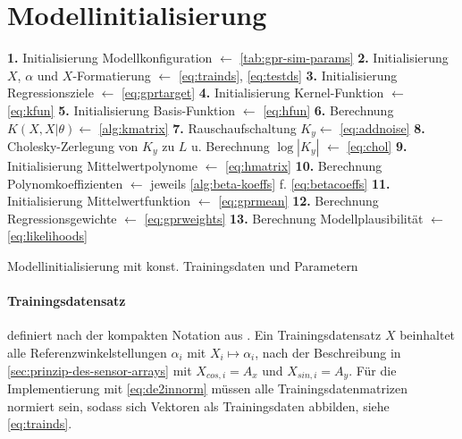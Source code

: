 \clearpage



\section{Modellinitialisierung}\label{sec:gprinit}


\begin{algorithm}[bhp]
	\SetAlgoLined
	\textbf{1.} Initialisierung Modellkonfiguration $\leftarrow$ \autoref{tab:gpr-sim-params}\;
	\textbf{2.} Initialisierung $X$, $\alpha$ und $X$-Formatierung $\leftarrow$ \autoref{eq:trainds}, \autoref{eq:testds}\;
	\textbf{3.} Initialisierung Regressionsziele $\leftarrow$ \autoref{eq:gprtarget}\;
	\textbf{4.} Initialisierung Kernel-Funktion $\leftarrow$ \autoref{eq:kfun}\;
	\textbf{5.} Initialisierung Basis-Funktion $\leftarrow$ \autoref{eq:hfun}\;
	\textbf{6.} Berechnung $K(X,X|\theta) \leftarrow$ \autoref{alg:kmatrix}\;
	\textbf{7.} Rauschaufschaltung $K_y \leftarrow$ \autoref{eq:addnoise}\;
	\textbf{8.} Cholesky-Zerlegung von $K_y$ zu $L$ u. Berechnung $\log |K_y|$ $\leftarrow$ \autoref{eq:chol}\;
	\textbf{9.} Initialisierung Mittelwertpolynome $\leftarrow$ \autoref{eq:hmatrix}\;
	\textbf{10.} Berechnung Polynomkoeffizienten $\leftarrow$ jeweils \autoref{alg:beta-koeffs} f. \autoref{eq:betacoeffs}\;
	\textbf{11.} Initialisierung Mittelwertfunktion $\leftarrow$ \autoref{eq:gprmean}\;
	\textbf{12.} Berechnung Regressionsgewichte $\leftarrow$ \autoref{eq:gprweights}\;
	\textbf{13.} Berechnung Modellplausibilität $\leftarrow$ \autoref{eq:likelihoods}\;
	\caption{Modellinitialisierung mit konst. Trainingsdaten und Parametern}
	\label{alg:gprinit}
\end{algorithm}


\clearpage


\paragraph*{Trainingsdatensatz} definiert nach der kompakten Notation aus \cite{Rasmussen2006}. Ein Trainingsdatensatz $X$ beinhaltet alle Referenzwinkelstellungen $\alpha_i$ mit $X_i \mapsto \alpha_i$, nach der Beschreibung in \autoref{sec:prinzip-des-sensor-arrays} mit $X_{cos,i} = A_x$ und $X_{sin,i} = A_y$. Für die Implementierung mit \autoref{eq:de2innorm} müssen alle Trainingsdatenmatrizen normiert sein, sodass sich Vektoren als Trainingsdaten abbilden, siehe \autoref{eq:trainds}.


